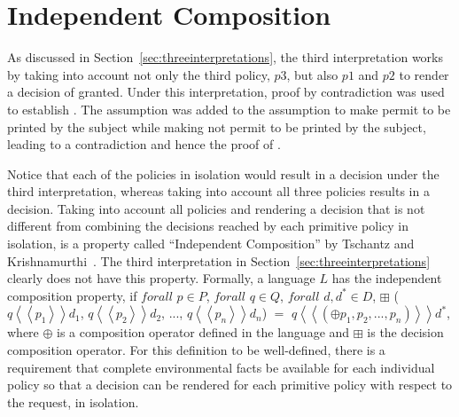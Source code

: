 \section{Independent Composition}\label{sec:indepcompos}

As discussed in Section~\ref{sec:threeinterpretations}, the third interpretation works by taking into account not only the third policy, $p3$, but also $p1$ and $p2$ to render a decision of granted. Under this interpretation, proof by contradiction was used to establish . The assumption  was added to the assumption  to make  permit  to be printed by the subject while making  not permit  to be printed by the subject, leading to a contradiction and hence the proof of . 

Notice that each of the policies in isolation would result in a  decision under the third interpretation, whereas taking into account all three policies results in a  decision. Taking into account all policies and rendering a decision that is not different from combining the decisions reached by each primitive policy in isolation, is a property called ``Independent Composition'' by Tschantz and Krishnamurthi~\cite{Tschantz}. The third interpretation in Section~\ref{sec:threeinterpretations} clearly does not have this property. Formally, a language $L$ has the independent composition property, if $forall$ $p \in P$, $forall$ $q \in Q$, $forall$ $d, d^\ast \in D$, $\boxplus$ ($q \left\langle\left\langle p_{1}  \right\rangle\right\rangle d_{1}$, $q \left\langle\left\langle p_{2}  \right\rangle\right\rangle d_{2}$, ..., $q \left\langle\left\langle p_{n}  \right\rangle\right\rangle d_{n}$) $=$ $q \left\langle\left\langle (\oplus p_{1}, p_{2}, ..., p_{n}) \right\rangle\right\rangle d^\ast$, \\where $\oplus$ is a composition operator defined in the language and $\boxplus$ is the decision composition operator. For this definition to be well-defined, there is a requirement that complete environmental facts be available for each individual policy so that a decision can be rendered for each primitive policy with respect to the request, in isolation.

